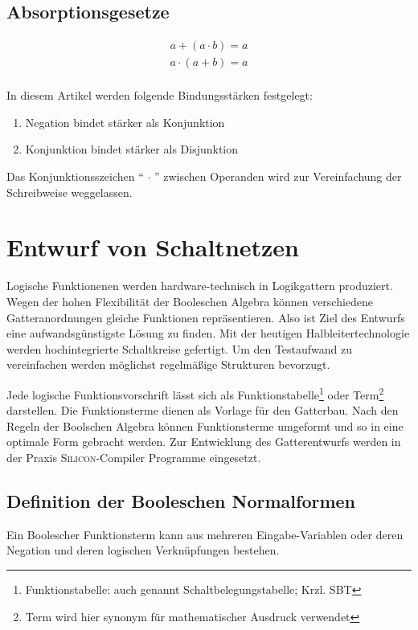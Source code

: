 \documentclass[11pt,a4paper]{scrreprt}
\begin{document}
\subsection*{Absorptionsgesetze}
\begin{align*}
	a + (a \cdot b) = a \\
	a \cdot (a + b) = a \\
\end{align*}

In diesem Artikel werden folgende Bindungsstärken festgelegt:
\begin{enumerate}
\item
	Negation bindet stärker als Konjunktion
\item
	Konjunktion bindet stärker als Disjunktion
\end{enumerate}

Das Konjunktionsszeichen "` $\cdot$ "' zwischen Operanden wird zur Vereinfachung der Schreibweise weggelassen.

\section{Entwurf von Schaltnetzen}
Logische Funktionenen werden hardware-technisch in Logikgattern produziert. Wegen der hohen Flexibilität der Booleschen Algebra können verschiedene Gatteranordnungen gleiche Funktionen repräsentieren. Also ist Ziel des Entwurfs eine aufwandsgünstigste Lösung zu finden. Mit der heutigen Halbleitertechnologie werden hochintegrierte Schaltkreise gefertigt. Um den Testaufwand zu vereinfachen werden möglichst regelmäßige Strukturen bevorzugt.

Jede logische Funktionsvorschrift lässt sich als Funktionstabelle\footnote{Funktionstabelle: auch genannt Schaltbelegungstabelle; Krzl. SBT} oder Term\footnote{Term wird hier synonym für mathematischer Ausdruck verwendet} darstellen. Die Funktionsterme dienen als Vorlage für den Gatterbau. Nach den Regeln der Boolschen Algebra können Funktionsterme umgeformt und so in eine optimale Form gebracht werden. Zur Entwicklung des Gatterentwurfs werden in der Praxis \textsc{Silicon}-Compiler Programme eingesetzt.

\subsection{Definition der Booleschen Normalformen}
Ein Boolescher Funktionsterm kann aus mehreren Eingabe-Variablen oder deren Negation und deren logischen Verknüpfungen bestehen.
\end{document}
